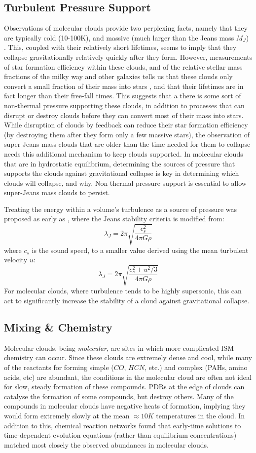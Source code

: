 \documentclass[12pt, preprint]{aastex}
\begin{document}
\subsection{Turbulent Pressure Support}
Observations of molecular clouds provide two perplexing facts, namely that they
are typically cold (10-100K), and massive (much larger than the Jeans mass
$M_J$) \citep{gold1978}.  This, coupled with their relatively short lifetimes,
seems to imply that they collapse gravitationally relatively quickly after they 
form.  However, measurements of star formation efficiency within these clouds,
and of the relative stellar mass fractions of the milky way and other galaxies
tells us that these clouds only convert a small fraction of their mass into
stars \citep{mac2004}, and that their lifetimes are in fact longer than their
free-fall times. This suggests that
a there is some sort of non-thermal pressure supporting these clouds, in
addition to processes that can disrupt or destroy clouds before they can convert
most of their mass into stars. While disruption of clouds by feedback can reduce
their star formation efficiency (by destroying them after they form only a few
massive stars)\citep{hopk2011}, the observation of super-Jeans mass clouds that
are older than the time needed for them to collapse needs this additional
mechanism to keep clouds supported.
In molecular clouds that are in hydrostatic equilibrium, determining the sources
of pressure that supports the clouds against gravitational collapse is key in
determining which clouds will collapse, and why.  Non-thermal pressure support is
essential to allow super-Jeans mass clouds to persist.

Treating the energy within a volume's turbulence as  a source of pressure was
proposed as early as \citet{chandra1951}, where the Jeans stability criteria is
modified from:
$$\lambda_J = 2\pi \sqrt{\frac{c_s^2}{4\pi G\rho}}$$
where $c_s$ is the sound speed, to a smaller value derived using the mean
turbulent velocity $u$:
$$\lambda_J = 2\pi \sqrt{\frac{c_s^2+u^2/3}{4\pi G\rho}}$$
For molecular clouds, where turbulence tends to be highly supersonic, this can
act to significantly increase the stability of a cloud against gravitational
collapse.
\subsection{Mixing \& Chemistry}
Molecular clouds, being \textit{molecular}, are sites in which more 
complicated ISM chemistry can occur.  Since these clouds are extremely dense and
cool, while many of the reactants for forming simple ($CO$, $HCN$, etc.) and
complex (PAHs, amino acids, etc) are abundant, the conditions in the molecular
cloud are often not ideal for slow, steady formation of these compounds.
PDRs at the edge of clouds can catalyse the formation of some compounds, but
destroy others.  Many of the compounds in molecular clouds have negative heats
of formation, implying they would form extremely slowly at the mean $\approx
10K$ temperatures in the cloud.  In addition to this, chemical reaction networks
found that early-time solutions to time-dependent evolution equations (rather
than equilibrium concentrations) matched most closely the observed abundances in
molecular clouds\citep{scalo2004}.
\end{document}

